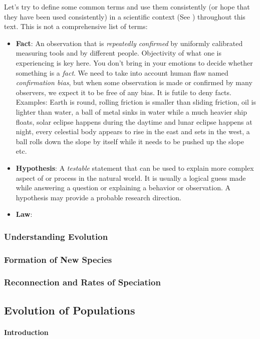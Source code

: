 \documentclass[12pt]{article}
\begin{document}
Let's try to define some common terms and use them consistently (or hope that they have been used consistently) in a scientific context (See \cite{teaching-evol}) throughout this text. This is not a comprehensive list of terms:
\begin{itemize}
    \item \textbf{Fact}: An observation that is \emph{repeatedly confirmed} by uniformly calibrated measuring tools and by different people. Objectivity of what one is experiencing is key here. You don't bring in your emotions to decide whether something is a \emph{fact}. We need to take into account human flaw named \emph{confirmation bias}, but when some observation is made or confirmed by many observers, we expect it to be free of any bias. It is futile to deny facts. Examples: Earth is round, rolling friction is smaller than sliding friction, oil is lighter than water, a ball of metal sinks in water while a much heavier ship floats, solar eclipse happens during the daytime and lunar eclipse happens at night, every celestial body appears to rise in the east and sets in the west, a ball rolls down the slope by itself while it needs to be pushed up the slope etc.
    \item \textbf{Hypothesis}: A \emph{testable} statement that can be used to explain more complex aspect of or process in the natural world. It is usually a logical guess made while answering a question or explaining a behavior or observation. A hypothesis may provide a probable research direction.
    \item \textbf{Law}: 
\end{itemize}

\subsubsection{Understanding Evolution}
\subsubsection{Formation of New Species}
\subsubsection{Reconnection and Rates of Speciation}


\subsection{Evolution of Populations}
\paragraph{Introduction}
\end{document}
